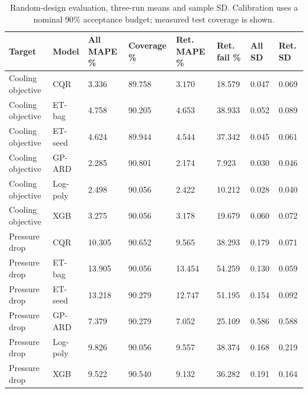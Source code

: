 \begin{table}[htbp]\centering\small\setlength{\tabcolsep}{3pt}\begin{tabular}{llllllll}
\toprule
Target & Model & All MAPE \% & Coverage \% & Ret. MAPE \% & Ret. fail \% & All SD & Ret. SD\\\midrule
Cooling objective & CQR & 3.336 & 89.758 & 3.170 & 18.579 & 0.047 & 0.069\\
Cooling objective & ET-bag & 4.758 & 90.205 & 4.653 & 38.933 & 0.052 & 0.089\\
Cooling objective & ET-seed & 4.624 & 89.944 & 4.544 & 37.342 & 0.045 & 0.061\\
Cooling objective & GP-ARD & 2.285 & 90.801 & 2.174 & 7.923 & 0.030 & 0.046\\
Cooling objective & Log-poly & 2.498 & 90.056 & 2.422 & 10.212 & 0.028 & 0.040\\
Cooling objective & XGB & 3.275 & 90.056 & 3.178 & 19.679 & 0.060 & 0.072\\
Pressure drop & CQR & 10.305 & 90.652 & 9.565 & 38.293 & 0.179 & 0.071\\
Pressure drop & ET-bag & 13.905 & 90.056 & 13.454 & 54.259 & 0.130 & 0.059\\
Pressure drop & ET-seed & 13.218 & 90.279 & 12.747 & 51.195 & 0.154 & 0.092\\
Pressure drop & GP-ARD & 7.379 & 90.279 & 7.052 & 25.109 & 0.586 & 0.588\\
Pressure drop & Log-poly & 9.826 & 90.056 & 9.557 & 38.374 & 0.168 & 0.219\\
Pressure drop & XGB & 9.522 & 90.540 & 9.132 & 36.282 & 0.191 & 0.164\\
\bottomrule\end{tabular}\caption{Random-design evaluation, three-run means and sample SD. Calibration uses a nominal 90\% acceptance budget; measured test coverage is shown.}\label{tab:ubend-supplied_random}\end{table}
